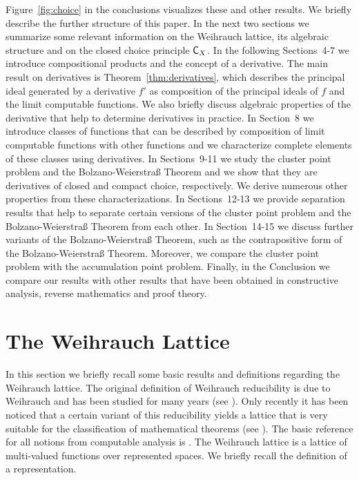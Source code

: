 \documentclass[a4paper]{amsart}
\def\C{\mbox{\rm\sffamily C}}
\theoremstyle{definition}
\begin{document}
Figure~\ref{fig:choice} in the conclusions visualizes these and other results. 
We briefly describe the further structure of this paper. 
In the next two sections we summarize some relevant information on the Weihrauch lattice,
its algebraic structure and on the closed choice principle $\C_X$. 
In the following Sections~4-7 we introduce compositional products and the concept of a derivative.
The main result on derivatives is Theorem~\ref{thm:derivatives}, which describes the principal ideal
generated by a derivative $f'$ as composition of the principal ideals of $f$ and the limit computable functions.
We also briefly discuss algebraic properties of the derivative that help to determine derivatives in practice. 
In Section~8 we introduce classes of functions that can be described by composition of limit computable
functions with other functions and we characterize complete elements of these classes using derivatives.
In Sections~9-11 we study the cluster point problem and the Bolzano-Weierstra\ss{} Theorem
and we show that they are derivatives of closed and compact choice, respectively. 
We derive numerous other properties from these characterizations. 
In Sections~12-13 we provide separation results that help to separate certain versions of the
cluster point problem and the Bolzano-Weierstra\ss{} Theorem from each other.
In Section~14-15 we discuss further variants of the Bolzano-Weierstra\ss{} Theorem, such 
as  
the contrapositive form of the Bolzano-Weierstra\ss{} Theorem.
Moreover, we compare the cluster point problem with the accumulation point problem.
Finally, in the Conclusion we compare our results with other results that have been obtained
in constructive analysis, reverse mathematics and proof theory.


\section{The Weihrauch Lattice}

In this section we briefly recall some basic results and definitions regarding
the Weihrauch lattice. The original definition of Weihrauch reducibility is due to Weihrauch
and has been studied for many years (see \cite{Ste89,Wei92a,Wei92c,Her96}).
Only recently it has been noticed that a certain variant of this reducibility yields
a lattice that is very suitable for the classification of mathematical theorems
(see  \cite{GM09,BG11,BG11a,Pau09,BBP,Pau10}). The basic reference for all notions
from computable analysis is \cite{Wei00}.
The Weihrauch lattice is a lattice of multi-valued functions over represented
spaces. We briefly recall the definition of a representation.
\end{document}
